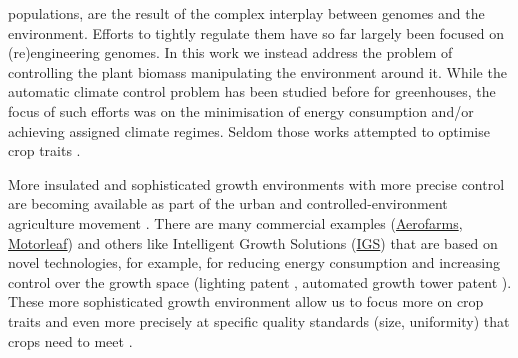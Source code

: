 populations, are the result of the complex interplay between genomes and the
environment. Efforts to tightly regulate them have so far largely been focused
on (re)engineering genomes. In this work we instead address the problem of
controlling the plant biomass manipulating the environment around it. While the
automatic climate control problem has been studied before for greenhouses, the
focus of such efforts was on the minimisation of energy consumption and/or
achieving assigned climate regimes. Seldom those works attempted to optimise
crop traits \citep{Chalabi1996, udinktenCate1983, Challa_1990, Aaslyng2003}.

More insulated and sophisticated growth environments with more precise control
are becoming available as part of the urban and controlled-environment
agriculture movement \citep{mok_strawberry_2014, despommier_farming_2013}. There
are many commercial examples (\href{https://aerofarms.com/}{Aerofarms},
\href{https://motorleaf.com/}{Motorleaf}) and others like Intelligent Growth
Solutions (\href{https://www.intelligentgrowthsolutions.com/}{IGS}) that are
based on novel technologies, for example, for reducing energy consumption and
increasing control over the growth space (lighting patent
\cite{aykroyd_novel_2016}, automated growth tower patent
\cite{aykroyd_automated_2018}). These more sophisticated growth environment
allow us to focus more on crop traits and even more precisely at specific
quality standards (size, uniformity) that crops need to meet \citep[see for
example EU marketing standards on fruit and vegetables;][]{eu-543-2011}.

